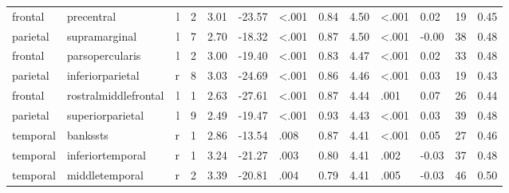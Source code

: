 \documentclass{article}
\begin{document}
\begin{longtable}{llrR{1.3cm}R{1cm}R{1.3cm}R{1cm}R{1cm}R{1.3cm}R{1cm}R{1.8cm}R{1.3cm}R{1.8cm}}
   frontal &                precentral &    l &         2 &                  3.01 &           -23.57 &      \textless.001 &                               0.84 &                          4.50 &                   \textless.001 &   0.02 &     19 &      0.45 \\
  parietal &             supramarginal &    l &         7 &                  2.70 &           -18.32 &      \textless.001 &                               0.87 &                          4.50 &                   \textless.001 &  -0.00 &     38 &      0.48 \\
   frontal &           parsopercularis &    l &         2 &                  3.00 &           -19.40 &      \textless.001 &                               0.83 &                          4.47 &                   \textless.001 &   0.02 &     33 &      0.48 \\
  parietal &          inferiorparietal &    r &         8 &                  3.03 &           -24.69 &      \textless.001 &                               0.86 &                          4.46 &                   \textless.001 &   0.03 &     19 &      0.43 \\
   frontal &      rostralmiddlefrontal &    l &         1 &                  2.63 &           -27.61 &      \textless.001 &                               0.87 &                          4.44 &                            .001 &   0.07 &     26 &      0.44 \\
  parietal &          superiorparietal &    l &         9 &                  2.49 &           -19.47 &      \textless.001 &                               0.93 &                          4.43 &                   \textless.001 &   0.03 &     39 &      0.48 \\
  temporal &                  bankssts &    r &         1 &                  2.86 &           -13.54 &               .008 &                               0.87 &                          4.41 &                   \textless.001 &   0.05 &     27 &      0.46 \\
  temporal &          inferiortemporal &    r &         1 &                  3.24 &           -21.27 &               .003 &                               0.80 &                          4.41 &                            .002 &  -0.03 &     37 &      0.48 \\
  temporal &            middletemporal &    r &         2 &                  3.39 &           -20.81 &               .004 &                               0.79 &                          4.41 &                            .005 &  -0.03 &     46 &      0.50 \\

\end{longtable}
\end{document}

